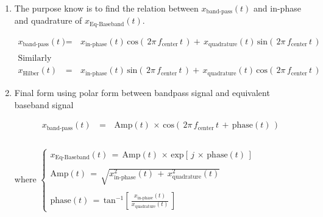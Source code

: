 \begin{enumerate}
\item  The purpose know is to find the relation between $x_{\text{band-pass}}(t)$ and in-phase and quadrature of $x_{\text{Eq-Baseband}}(t)$.

\begin{equation}
\begin{array}{rcl}
x_{\text{band-pass}}(t) \, &=& \, x_{\text{in-phase}}(t) \, \text{cos}\left(\, 2 \pi \, f_{\text{center}} \, t \,\right) + \, x_{\text{quadrature}}(t) \, \text{sin}\left(\, 2 \pi \, f_{\text{center}} \, t \,\right) \\ \\

\text{Similarly but less important} \\ 
x_{\text{Hilber}}(t) \, &=& \, x_{\text{in-phase}}(t) \, \text{sin}\left(\, 2 \pi \, f_{\text{center}} \, t \,\right) + \, x_{\text{quadrature}}(t) \, \text{cos}\left(\, 2 \pi \, f_{\text{center}} \, t \,\right) 
\end{array}
\end{equation}


\item Final form using polar form between bandpass signal and equivalent baseband signal

\begin{equation}
\begin{array}{rcl}
x_{\text{band-pass}}(t) \, &=&\, \text{Amp}(t) \, \times \, \text{cos}\left(\, 2 \pi \, f_{\text{center}} \, t \, + \, \text{phase}(t) \,\right)\\ \\
\end{array}
\label{Eq:Sampling:based_band_general_form_time_domain}
\end{equation}

where $\begin{cases}
x_{\text{Eq-Baseband}}(t) \, = \, \text{Amp}(t)\,\times \, \text{exp}\left[\, j \,\times \, \text{phase}(t) \,\right] \\ \\
\text{Amp}(t) \, = \, \sqrt{ x_{\text{in-phase}}^2(t) \, + \, x_{\text{quadrature}}^2(t)} \\ \\
\text{phase}(t) \,  = \, \text{tan}^{-1}\left[\, \displaystyle\frac{x_{\text{in-phase}}(t)}{x_{\text{quadrature}}(t)} \,\right] 
\end{cases}$

	\begin{itemize}
	

\end{itemize}
\end{enumerate}
